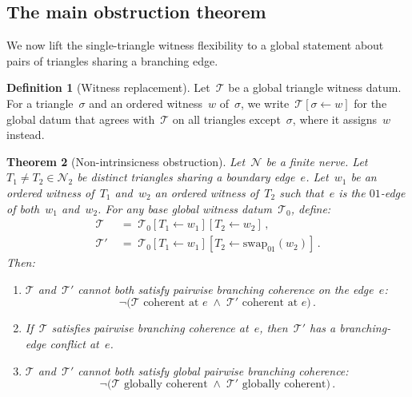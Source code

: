 \documentclass[11pt,a4paper]{article}
\theoremstyle{plain}
\newtheorem{theorem}{Theorem}[section]
\theoremstyle{definition}
\newtheorem{definition}[theorem]{Definition}
\theoremstyle{remark}
\newcommand{\cN}{\mathcal{N}}
\newcommand{\cT}{\mathcal{T}}
\newcommand{\swapAB}{\mathrm{swap}_{01}}
\begin{document}
\subsection{The main obstruction theorem}
\label{sec:main-theorem}

We now lift the single-triangle witness flexibility to a global statement
about pairs of triangles sharing a branching edge.

\begin{definition}[Witness replacement]
\label{def:replacement}
Let~$\cT$ be a global triangle witness datum. For a triangle~$\sigma$
and an ordered witness~$w$ of~$\sigma$, we write~$\cT[\sigma \leftarrow w]$
for the global datum that agrees with~$\cT$ on all triangles except~$\sigma$,
where it assigns~$w$ instead.
\end{definition}

\begin{theorem}[Non-intrinsicness obstruction]
\label{thm:main-obstruction}
Let~$\cN$ be a finite nerve. Let~$T_1 \neq T_2 \in \cN_2$ be distinct
triangles sharing a boundary edge~$e$. Let~$w_1$ be an ordered witness
of~$T_1$ and~$w_2$ an ordered witness of~$T_2$ such that~$e$ is the
$01$-edge of both~$w_1$ and~$w_2$. For any base global witness
datum~$\cT_0$, define:
\begin{align}
  \cT &\;=\; \cT_0[T_1 \leftarrow w_1][T_2 \leftarrow w_2]\,,
  \label{eq:tau} \\
  \cT' &\;=\; \cT_0[T_1 \leftarrow w_1][T_2 \leftarrow \swapAB(w_2)]\,.
  \label{eq:tau-swap}
\end{align}
Then:
\begin{enumerate}[label=\textup{(\alph*)},nosep]
  \item\label{item:not-both}
    $\cT$ and~$\cT'$ cannot both satisfy pairwise branching coherence
    on the edge~$e$:
    \[
      \neg\bigl(\text{$\cT$ coherent at $e$}
      \;\wedge\;
      \text{$\cT'$ coherent at $e$}\bigr)\,.
    \]
  \item\label{item:conditional}
    If~$\cT$ satisfies pairwise branching coherence at~$e$, then~$\cT'$
    has a branching-edge conflict at~$e$.
  \item\label{item:global}
    $\cT$ and~$\cT'$ cannot both satisfy \emph{global} pairwise
    branching coherence:
    \[
      \neg\bigl(\text{$\cT$ globally coherent}
      \;\wedge\;
      \text{$\cT'$ globally coherent}\bigr)\,.
    \]
\end{enumerate}
\end{theorem}
\end{document}
